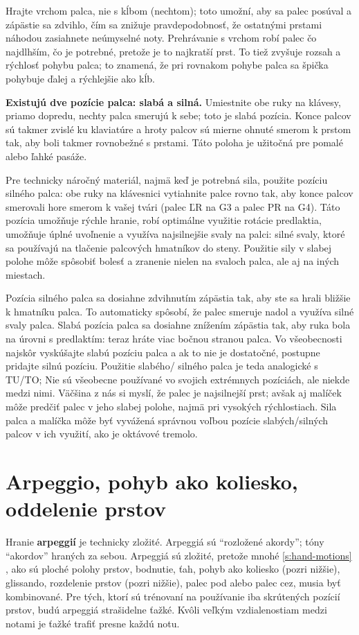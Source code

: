\documentclass[11pt,a4paper]{book}
\newcommand*{\fullref}[1]{\hyperref[{#1}]{\ref*{#1} \nameref*{#1}}} %
\begin{document}
Hrajte vrchom palca, nie s kĺbom (nechtom); toto umožní, aby sa palec posúval a zápästie sa zdvihlo, čím sa znižuje pravdepodobnosť, že ostatnými prstami náhodou zasiahnete neúmyselné noty. Prehrávanie s vrchom robí palec čo najdlhším, čo je potrebné, pretože je to najkratší prst. To tiež zvyšuje rozsah a rýchlosť pohybu palca; to znamená, že pri rovnakom pohybe palca sa špička pohybuje ďalej a rýchlejšie ako kĺb.

\textbf{Existujú dve pozície palca: slabá a silná.} Umiestnite obe ruky na klávesy, priamo dopredu, nechty palca smerujú k sebe; toto je slabá pozícia. Konce palcov sú takmer zvislé ku klaviatúre a hroty palcov sú mierne ohnuté smerom k prstom tak, aby boli takmer rovnobežné s prstami. Táto poloha je užitočná pre pomalé alebo ľahké pasáže.

Pre technicky náročný materiál, najmä keď je potrebná sila, použite pozíciu silného palca: obe ruky na klávesnici vytiahnite palce rovno tak, aby konce palcov smerovali hore smerom k vašej tvári (palec ĽR na G3 a palec PR na G4). Táto pozícia umožňuje rýchle hranie, robí optimálne využitie rotácie predlaktia, umožňuje úplné uvoľnenie a využíva najsilnejšie svaly na palci: silné svaly, ktoré sa používajú na tlačenie palcových hmatníkov do steny. Použitie sily v slabej polohe môže spôsobiť bolesť a zranenie nielen na svaloch palca, ale aj na iných miestach.

Pozícia silného palca sa dosiahne zdvihnutím zápästia tak, aby ste sa hrali bližšie k hmatníku palca. To automaticky spôsobí, že palec smeruje nadol a využíva silné svaly palca. Slabá pozícia palca sa dosiahne znížením zápästia tak, aby ruka bola na úrovni s predlaktím: teraz hráte viac bočnou stranou palca. Vo všeobecnosti najskôr vyskúšajte slabú pozíciu palca a ak to nie je dostatočné, postupne pridajte silnú pozíciu. Použitie slabého/ silného palca je teda analogické s TU/TO; Nie sú všeobecne používané vo svojich extrémnych pozíciách, ale niekde medzi nimi. Väčšina z nás si myslí, že palec je najsilnejší prst; avšak aj malíček môže predčiť palec v jeho slabej polohe, najmä pri vysokých rýchlostiach. Sila palca a malíčka môže byť vyvážená správnou voľbou pozície slabých/silných palcov v ich  využití, ako je oktávové tremolo.

\section{Arpeggio, pohyb ako koliesko, oddelenie prstov}\label{s:arpeggio}
Hranie \textbf{arpeggií} je technicky zložité. Arpeggiá sú “rozložené akordy”; tóny “akordov” hraných za sebou. Arpeggiá sú zložité, pretože mnohé \fullref{s:hand-motions}, ako sú ploché polohy prstov, bodnutie, ťah, pohyb ako koliesko (pozri nižšie), glissando, rozdelenie prstov (pozri nižšie), palec pod alebo palec cez, musia byť kombinované. Pre tých, ktorí sú trénovaní na používanie iba skrútených pozícií prstov, budú arpeggiá strašidelne ťažké. Kvôli veľkým vzdialenostiam medzi notami je ťažké trafiť presne každú notu.
\end{document}
